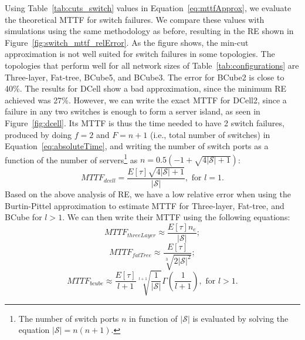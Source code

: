 Using Table~\ref{tab:cuts_switch} values in Equation~\ref{eq:mttfApprox}, we evaluate the theoretical MTTF for switch failures.
We compare these values with simulations using the same methodology as before, resulting in the RE shown in Figure~\ref{fig:switch_mttf_relError}. 
As the figure shows, the min-cut approximation is not well suited for switch failures in some topologies. The topologies that perform well for all network sizes of Table~\ref{tab:configurations} are Three-layer, Fat-tree, BCube5, and BCube3. 
The error for BCube2 is close to 40\%. The results for DCell show a bad approximation, since the minimum RE achieved was 27\%. 
However, we can write the exact MTTF for DCell2, since a failure in any two switches is enough to form a server island, as seen in Figure~\ref{fig:dcell}. 
Its MTTF is thus the time needed to have 2 switch failures, produced by doing $f=2$ and $F=n+1$ (i.e., total number of switches) in Equation~\ref{eq:absoluteTime}, 
and writing the number of switch ports as a function of the number of servers\footnote{The number of switch ports $n$ in function of $|\mathcal{S}|$ is evaluated by solving the equation $|\mathcal{S}|=n(n+1)$.} as $n=0.5(-1 + \sqrt{4|\mathcal{S}|+1})$: 
\begin{equation}
MTTF_{dcell} =  \frac{E[\tau] \sqrt{4|\mathcal{S}|+1}}{|\mathcal{S}|}, \text{ for } l=1.
\label{mttf_dcell2_switch}
\end{equation}
Based on the above analysis of RE, we have a low relative error when using the Burtin-Pittel approximation to estimate MTTF for Three-layer, Fat-tree, and BCube for $l > 1$. We can then write their MTTF using the following equations:
\begin{equation}
MTTF_{threeLayer} \approx \frac{E[\tau]n_e}{|\mathcal{S}|};
\label{mttf_conventional_switch}
\end{equation}
\begin{equation}
MTTF_{fatTree} \approx \frac{E[\tau]}{\sqrt[3]{2|\mathcal{S}|^2}};
\label{mttf_fatTree_switch}
\end{equation}
\begin{equation}
MTTF_{bcube} \approx \frac{E[\tau]}{l+1}\sqrt[l+1]{\frac{1}{|\mathcal{S}|}} \Gamma \left (  \frac{1}{l+1} \right ), \text{ for } l > 1 .
\end{equation}

